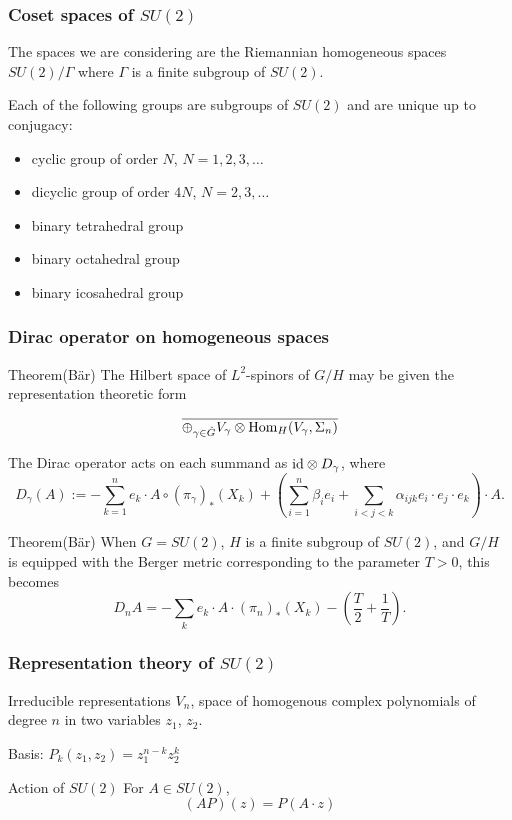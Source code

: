 \documentclass{beamer}
\def\Hom{{\rm Hom}}
\def\id{{\rm id}}
\begin{document}
\begin{frame}
  \frametitle{Coset spaces of $SU(2)$}
  \begin{block}{}
    The spaces we are considering are the Riemannian homogeneous spaces $SU(2)/\Gamma$ where $\Gamma$ is a finite subgroup of $SU(2)$.

    Each of the following groups are subgroups of $SU(2)$ and are unique up to conjugacy:
    \begin{itemize}
      \item cyclic group of order $N$, $N = 1,2,3,\ldots$
      \item dicyclic group of order $4N$, $N = 2,3,\ldots$
      \item binary tetrahedral group
      \item binary octahedral group
      \item binary icosahedral group
    \end{itemize}
  \end{block}
\end{frame}

\begin{frame}
  \frametitle{Dirac operator on homogeneous spaces}
  \begin{block}{Theorem(B\"ar)}
    The Hilbert space of $L^2$-spinors of $G/H$ may be given the representation theoretic form

    \[
      \overline{\oplus_{\gamma \in \hat{G}} V_{\gamma} \otimes \Hom_{H}(V_{\gamma}, \Sigma_{n})}
    \]
    
    The Dirac operator acts on each summand as $\id \otimes D_{\gamma}$, where
    \[
    D_{\gamma}(A) := - \sum_{k=1}^n e_k \cdot A \circ (\pi_{\gamma})_* (X_k)
+ \left( \sum_{i=1}^n \beta_i e_i + \sum_{i<j<k}\alpha_{ijk}e_i \cdot e_j \cdot e_k \right) \cdot A.
    \]
  \end{block}
\end{frame}

\begin{frame}
  \begin{block}{Theorem(B\"ar)}
  When $G = SU(2)$, $H$ is a finite subgroup of $SU(2)$, and $G/H$ is equipped with the Berger metric corresponding to the parameter $T>0$, this becomes
  \[
D_n A = - \sum _k e_k \cdot A \cdot (\pi_n)_*(X_k) - \left( \frac{T}{2} + \frac{1}{T} \right).
\]
  \end{block}
\end{frame}

\begin{frame}
	\frametitle{Representation theory of $SU(2)$}
  \begin{block}{Irreducible representations}
	$V_n$, space of homogenous complex polynomials of degree $n$ in two variables $z_1$, $z_2$.
	
	Basis: $P_k(z_1,z_2) = z_1^{n-k}z_2^k$
  \end{block}
  
  \begin{block}{Action of $SU(2)$}
  	For $A \in SU(2)$,
	\[
	(AP)(z) = P(A\cdot z) 
	\]
  \end{block}
\end{frame}
\end{document}
